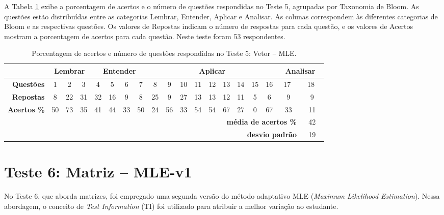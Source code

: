 A Tabela \ref{tab:respostas_atualizada_teste5} exibe a porcentagem de acertos e o número de questões respondidas no Teste 5, agrupadas por Taxonomia de Bloom. As questões estão distribuídas entre as categorias Lembrar, Entender, Aplicar e Analisar. As colunas correspondem às diferentes categorias de Bloom e as respectivas questões. Os valores de Repostas indicam o número de respostas para cada questão, e os valores de Acertos mostram a porcentagem de acertos para cada questão. Neste teste foram 53 respondentes.


\begin{table}[!ht]
    \centering
    \caption{Porcentagem de acertos e número de questões respondidas no Teste 5: Vetor -- MLE.}
    \label{tab:respostas_atualizada_teste5}
    \setlength{\tabcolsep}{4.7pt} %
    \begin{tabular}{|r|*{18}{c|}}
        \hline
        \multicolumn{1}{|l|}{} & \multicolumn{3}{c|}{\cellcolor{green!25}\textbf{Lembrar}} & \multicolumn{4}{c|}{\cellcolor{yellow!25}\textbf{Entender}} & \multicolumn{9}{c|}{\cellcolor{red!25}\textbf{Aplicar}} & \multicolumn{2}{c|}{\cellcolor{blue!25}\textbf{Analisar}} \\ \hline
        \rowcolor[HTML]{D9D9D9} 
        \textbf{Questões} & 1 & 2 & 3 & 4 & 5 & 6 & 7 & 8 & 9 & 10 & 11 & 12 & 13 & 14 & 15 & 16 & \  17 \ & \  18 \   \\
        \textbf{Repostas} & 8 & 22 & 31 & 32 & 16 & 9 & 8 & 25 & 9 & 27 & 13 & 13 & 12 & 11 & 5 & 6 & 9 & 9 \\
        \rowcolor[HTML]{D9D9D9} 
        \textbf{Acertos \%} & 50 & 73 & 35 & 41 & 44 & 33 & 50 & 24 & 56 & 33 & 54 & 54 & 67 & 27 & 0 & 67 & 33 & 11 \\ \hline
        \multicolumn{13}{r}{} & \multicolumn{5}{r}{\cellcolor[HTML]{F9CB9C}\textbf{média de acertos \%}} & \multicolumn{1}{c}{\cellcolor[HTML]{F9CB9C}42} \\ 
        \multicolumn{13}{r}{} & \multicolumn{5}{r}{\cellcolor[HTML]{F9CB9C}\textbf{desvio padrão}} & \multicolumn{1}{c}{\cellcolor[HTML]{F9CB9C}19} \\ 
    \end{tabular}
\end{table}


\section{Teste 6: Matriz -- MLE-v1}

No Teste 6, que aborda matrizes, foi empregado uma segunda versão do método adaptativo MLE (\textit{Maximum Likelihood Estimation}). Nessa abordagem, o conceito de \textit{Test Information} (TI) foi utilizado para atribuir a melhor variação ao estudante. 

